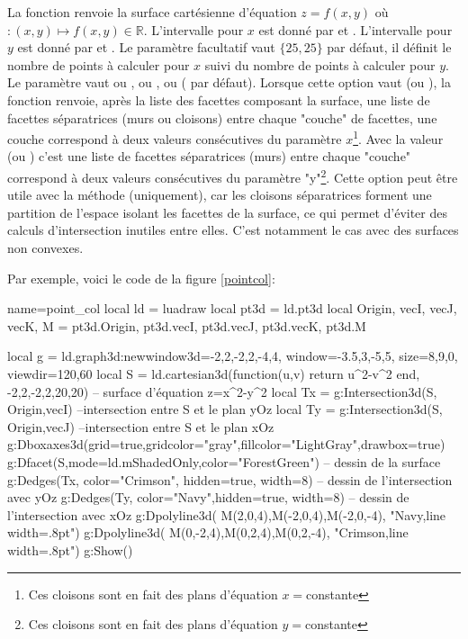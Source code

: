 La fonction  renvoie la surface cartésienne d'équation $z=f(x,y)$ où $\colon(x,y)\mapsto f(x,y)\in\mathbb R$. L'intervalle pour $x$ est donné par  et . L'intervalle pour $y$ est donné par  et . Le paramètre facultatif  vaut $\{25,25\}$ par défaut, il définit le nombre de points à calculer pour $x$ suivi du nombre de points à calculer pour $y$. Le paramètre  vaut  ou , ou , ou  ( par défaut). Lorsque cette option vaut  (ou ), la fonction renvoie, après la liste des facettes composant la surface, une liste de facettes séparatrices (murs ou cloisons) entre chaque "couche" de facettes, une couche correspond à deux valeurs consécutives du paramètre $x$\footnote{Ces cloisons sont en fait des plans d'équation $x=$constante}. Avec la valeur  (ou ) c'est une liste de facettes séparatrices (murs) entre chaque "couche" correspond à deux valeurs consécutives du paramètre "y"\footnote{Ces cloisons sont en fait des plans d'équation $y=$constante}. Cette option peut être utile avec la méthode  (uniquement), car les cloisons séparatrices forment une partition de l'espace isolant les facettes de la surface, ce qui permet d'éviter des calculs d'intersection inutiles entre elles. C'est notamment le cas avec des surfaces non convexes.

Par exemple, voici le code de la figure \ref{pointcol}:
\begin{Luacode}
\begin{luadraw}{name=point_col}
local ld = luadraw
local pt3d = ld.pt3d
local Origin, vecI, vecJ, vecK, M = pt3d.Origin, pt3d.vecI, pt3d.vecJ, pt3d.vecK, pt3d.M

local g = ld.graph3d:new{window3d={-2,2,-2,2,-4,4}, window={-3.5,3,-5,5}, size={8,9,0}, viewdir={120,60}}
local S = ld.cartesian3d(function(u,v) return u^2-v^2 end, -2,2,-2,2,{20,20}) -- surface d'équation z=x^2-y^2
local Tx = g:Intersection3d(S, {Origin,vecI}) --intersection entre S et le plan yOz
local Ty = g:Intersection3d(S, {Origin,vecJ}) --intersection entre S et le plan xOz
g:Dboxaxes3d({grid=true,gridcolor="gray",fillcolor="LightGray",drawbox=true})
g:Dfacet(S,{mode=ld.mShadedOnly,color="ForestGreen"}) -- dessin de la surface
g:Dedges(Tx, {color="Crimson", hidden=true, width=8}) -- dessin de l'intersection avec yOz
g:Dedges(Ty, {color="Navy",hidden=true, width=8}) -- dessin de l'intersection avec xOz
g:Dpolyline3d( {M(2,0,4),M(-2,0,4),M(-2,0,-4)}, "Navy,line width=.8pt")
g:Dpolyline3d( {M(0,-2,4),M(0,2,4),M(0,2,-4)}, "Crimson,line width=.8pt")
g:Show()
\end{luadraw}
\end{Luacode}

